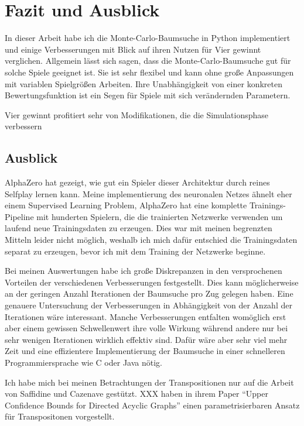 \section{Fazit und Ausblick}
\label{chap:fazit}
In dieser Arbeit habe ich die Monte-Carlo-Baumsuche in Python implementiert und einige Verbesserungen mit Blick auf ihren Nutzen für Vier gewinnt verglichen.
Allgemein lässt sich sagen, dass die Monte-Carlo-Baumsuche gut für solche Spiele geeignet ist.
Sie ist sehr flexibel und kann ohne große Anpassungen mit variablen Spielgrößen Arbeiten.
Ihre Unabhängigkeit von einer konkreten Bewertungsfunktion ist ein Segen für Spiele mit sich verändernden Parametern.

Vier gewinnt profitiert sehr von Modifikationen, die die Simulationsphase verbessern


\subsection{Ausblick}
AlphaZero hat gezeigt, wie gut ein Spieler dieser Architektur durch reines Selfplay lernen kann.
Meine implementierung des neuronalen Netzes ähnelt eher einem Supervised Learning Problem, AlphaZero hat eine komplette Trainings-Pipeline mit hunderten Spielern, die die trainierten Netzwerke verwenden um laufend neue Trainingsdaten zu erzeugen.
Dies war mit meinen begrenzten Mitteln leider nicht möglich, weshalb ich mich dafür entschied die Trainingsdaten separat zu erzeugen, bevor ich mit dem Training der Netzwerke beginne.

Bei meinen Auswertungen habe ich große Diskrepanzen in den versprochenen Vorteilen der verschiedenen Verbesserungen festgestellt.
Dies kann möglicherweise an der geringen Anzahl Iterationen der Baumsuche pro Zug gelegen haben.
Eine genauere Untersuchung der Verbesserungen in Abhängigkeit von der Anzahl der Iterationen wäre interessant.
Manche Verbesserungen entfalten womöglich erst aber einem gewissen Schwellenwert ihre volle Wirkung während andere nur bei sehr wenigen Iterationen wirklich effektiv sind.
Dafür wäre aber sehr viel mehr Zeit und eine effizientere Implementierung der Baumsuche in einer schnelleren Programmiersprache wie C oder Java nötig.

Ich habe mich bei meinen Betrachtungen der Transpositionen nur auf die Arbeit von Saffidine und Cazenave gestützt.
XXX haben in ihrem Paper ``Upper Confidence Bounds for Directed Acyclic Graphs'' einen parametrisierbaren Ansatz für Transpositonen vorgestellt.